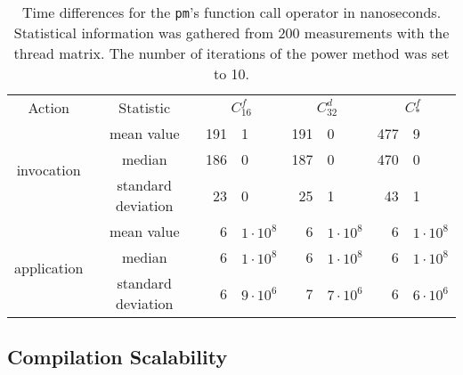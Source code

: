 \documentclass[10pt,a4paper]{article}
\theoremstyle{definition}\newtheorem{problem}{Problem}
\providecommand{\casex}[1]{\ensuremath{#1}}
\providecommand{\caseA}{\casex{C_{16}^f}}
\providecommand{\caseD}{\casex{C_{32}^d}}
\providecommand{\caseEf}{\casex{C_*^f}}
\begin{document}
\renewcommand{\arraystretch}{1.00}
\renewcommand{\tabcolsep}{2mm}
\begin{table}[t]
\caption{Time differences for the \texttt{pm}'s function call operator in nanoseconds. Statistical information was gathered from 200 measurements with the thread matrix. The number of iterations of the power method was set to 10.}
\begin{center}
\begin{tabular}{cc*{3}{r@{.}l}}
\toprule
Action & Statistic & \multicolumn{2}{c}{\caseA} & \multicolumn{2}{c}{\caseD} & \multicolumn{2}{c}{\caseEf} \rule[-0.5em]{0pt}{1.7em} \\ \cmidrule(r){1-1} \cmidrule(rl){2-2} \cmidrule(l){3-8}
\multirow{3}{*}{invocation} & mean value & 191 & 1 & 191 & 0 & 477 & 9 \rule[0em]{0pt}{1em} \\
& median & 186 & 0 & 187 & 0 & 470 & 0 \\
& standard deviation & 23 & 0 & 25 & 1 & 43 & 1 \\ \cmidrule(r){1-1} \cmidrule(rl){2-2} \cmidrule(l){3-8}
\multirow{3}{*}{application} & mean value & 6 & $1\cdot 10^8$ & 6 & $1\cdot 10^8$ & 6 & $1\cdot 10^8$ \rule[0em]{0pt}{1.15em} \\
& median & 6 & $1\cdot 10^8$ & 6 & $1\cdot 10^8$ & 6 & $1\cdot 10^8$ \\
& standard deviation & 6 & $9\cdot 10^6$ & 7 & $7\cdot 10^6$ & 6 & $6\cdot 10^6$ \\
\bottomrule
\end{tabular}
\end{center}
\label{tab:to}
\end{table}


\subsection{Compilation Scalability}
\end{document}
